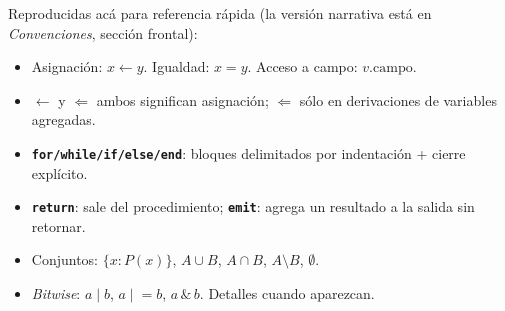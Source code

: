 Reproducidas acá para referencia rápida (la versión narrativa está en
\emph{Convenciones}, sección frontal):

\begin{itemize}
    \item Asignación: \(x \leftarrow y\). Igualdad: \(x = y\). Acceso a campo: \(v.\mathrm{campo}\).
    \item \(\leftarrow\) y \(\Leftarrow\) ambos significan asignación; \(\Leftarrow\) sólo en derivaciones de variables agregadas.
    \item \texttt{\textbf{for/while/if/else/end}}: bloques delimitados por indentación + cierre explícito.
    \item \texttt{\textbf{return}}: sale del procedimiento; \texttt{\textbf{emit}}: agrega un resultado a la salida sin retornar.
    \item Conjuntos: \(\{x : P(x)\}\), \(A \cup B\), \(A \cap B\), \(A \setminus B\), \(\emptyset\).
    \item \emph{Bitwise}: \(a \mid b\), \(a \mathrel{|}\!= b\), \(a \,\&\, b\). Detalles cuando aparezcan.
\end{itemize}

\cleardoublepage
